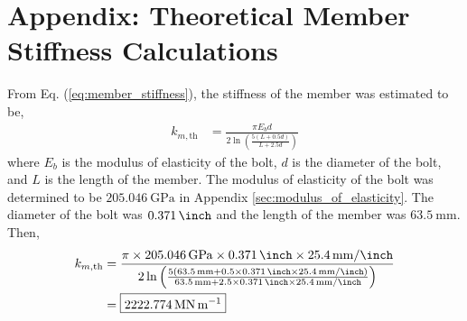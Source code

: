 \section{Appendix: Theoretical Member Stiffness Calculations}
\label{sec:theoretical_member_stiffness}

From Eq. (\ref{eq:member_stiffness}), the stiffness of the member was estimated to be, 
\begin{align*}
    k_{m, \text{th}} &= \frac{\pi E_b d}{2\ln\left(\frac{5(L+0.5d)}{L+2.5d}\right)}
\end{align*}
where $E_b$ is the modulus of elasticity of the bolt, $d$ is the diameter of the bolt, and $L$ is the length of the member. The modulus of elasticity of the bolt was determined to be $\qty{205.046}{\giga\pascal}$ in Appendix \ref{sec:modulus_of_elasticity}. The diameter of the bolt was $\qty{0.371}{\inch}$ and the length of the member was $\qty{63.5}{\milli\meter}$. Then,
\begin{align*}
    k_{m, \text{th}} &= \frac{\pi \times \qty{205.046}{\giga\pascal} \times \qty{0.371}{\inch} \times \qty{25.4}{\milli\meter\per\inch}}{2\ln\left(\frac{5(\qty{63.5}{\milli\meter}+0.5\times\qty{0.371}{\inch}\times \qty{25.4}{\milli\meter\per\inch})}{\qty{63.5}{\milli\meter}+2.5\times\qty{0.371}{\inch}\times \qty{25.4}{\milli\meter\per\inch}}\right)} \\
    &= \boxed{\qty{2222.774}{\mega\newton\per\meter}}
\end{align*}

